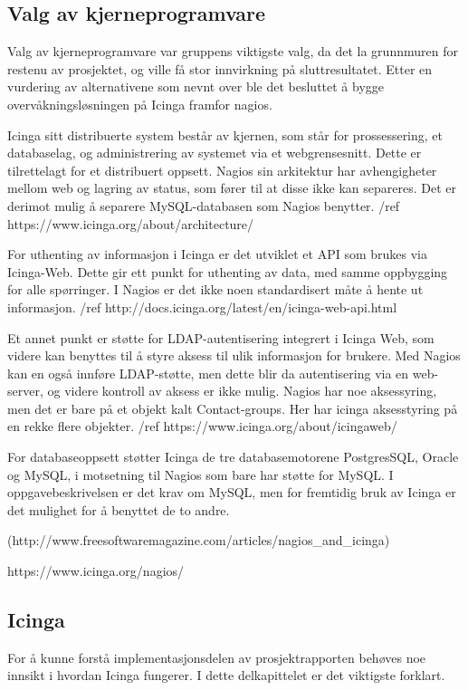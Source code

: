 \subsection{Valg av kjerneprogramvare}
Valg av kjerneprogramvare var gruppens viktigste valg, da det la grunnmuren for restenu av prosjektet, og ville få stor innvirkning på sluttresultatet. Etter en vurdering av alternativene som nevnt over ble det besluttet å bygge overvåkningsløsningen på Icinga framfor nagios.

Icinga sitt distribuerte system består av kjernen, som står for prossessering, et databaselag, og administrering av systemet via et webgrensesnitt. Dette er tilrettelagt for et distribuert oppsett. Nagios sin arkitektur har avhengigheter mellom web og lagring av status, som fører til at disse ikke kan separeres. Det er derimot mulig å separere MySQL-databasen som Nagios benytter. /ref https://www.icinga.org/about/architecture/

For uthenting av informasjon i Icinga er det utviklet et API som brukes via Icinga-Web. Dette gir ett punkt for uthenting av data, med samme oppbygging for alle spørringer. I Nagios er det ikke noen standardisert måte å hente ut informasjon. /ref http://docs.icinga.org/latest/en/icinga-web-api.html

Et annet punkt er støtte for LDAP-autentisering integrert i Icinga Web, som videre kan benyttes til å styre aksess til ulik informasjon for brukere. Med Nagios kan en også innføre LDAP-støtte, men dette blir da autentisering via en web-server, og videre kontroll av aksess er ikke mulig. Nagios har noe aksessyring, men det er bare på et objekt kalt Contact-groups. Her har icinga aksesstyring på en rekke flere objekter. /ref https://www.icinga.org/about/icingaweb/

For databaseoppsett støtter Icinga de tre databasemotorene PostgresSQL, Oracle og MySQL, i motsetning til Nagios som bare har støtte for MySQL. I oppgavebeskrivelsen er det krav om MySQL, men for fremtidig bruk av Icinga er det mulighet for å benyttet de to andre.

(http://www.freesoftwaremagazine.com/articles/nagios\_and\_icinga)

https://www.icinga.org/nagios/

\subsection{Icinga}

For å kunne forstå implementasjonsdelen av prosjektrapporten behøves noe innsikt i hvordan Icinga fungerer. I dette delkapittelet er det viktigste forklart.

